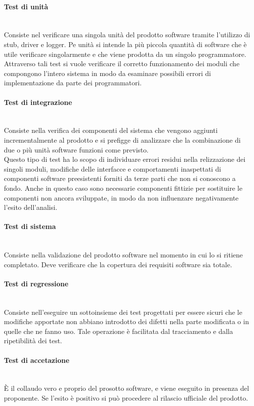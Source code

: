 \paragraph{Test di unità} \mbox{} \\
Consiste nel verificare una singola unità del prodotto software tramite l'utilizzo di stub, driver e logger. Pe unità si intende la più piccola quantità di software che è utile verificare singolarmente e che viene prodotta da un singolo programmatore. Attraverso tali test si vuole verificare il corretto funzionamento dei moduli che compongono l'intero sistema in modo da esaminare possibili errori di implementazione da parte dei programmatori.

\paragraph{Test di integrazione} \mbox{} \\
Consiste nella verifica dei componenti del sistema che vengono aggiunti incrementalmente al prodotto e si prefigge di analizzare che la combinazione di due o più unità software funzioni come previsto. \\ 
Questo tipo di test ha lo scopo di individuare errori residui nella relizzazione dei singoli moduli, modifiche delle interfacce e comportamenti inaspettati di componenti software preesistenti forniti da terze parti che non si conoscono a fondo. Anche in questo caso sono necessarie componenti fittizie per sostituire le componenti non ancora sviluppate, in modo da non influenzare negativamente l'esito dell'analisi.

\paragraph{Test di sistema} \mbox{} \\
Consiste nella validazione del prodotto software nel momento in cui lo si ritiene completato. Deve verificare che la copertura dei requisiti software sia totale.

\paragraph{Test di regressione} \mbox{} \\
Consiste nell'eseguire un sottoinsieme dei test progettati per essere sicuri che le modifiche apportate non abbiano introdotto dei difetti nella parte modificata o in quelle che ne fanno uso. Tale operazione è facilitata dal tracciamento e dalla ripetibilità dei test.

\paragraph{Test di accetazione} \mbox{} \\
È il collaudo vero e proprio del prosotto software, e viene eseguito in presenza del proponente. Se l'esito è positivo si può procedere al rilascio ufficiale del prodotto.
